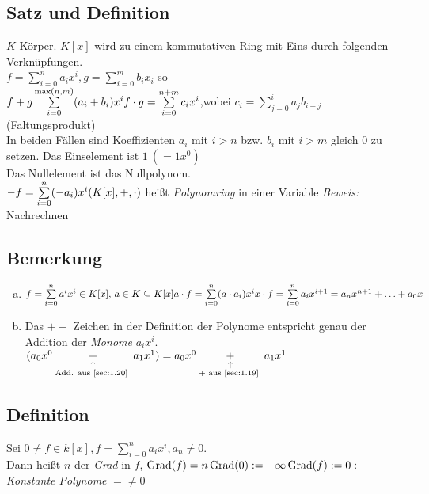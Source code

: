 \subsection{Satz und Definition}\label{sec:1.20}
$K$ Körper. $K[x]$ wird zu einem kommutativen Ring mit Eins durch folgenden Verknüpfungen.\\
$f = \sum\limits_{i=0}^{n} a_ix^i, g = \sum\limits_{i=0}^{m}b_ix_i$ so \\
$f + g \sum\limits_{i=0}^{\max(n,m)} (a_i+b_i)x^i\\
f \cdot g = \sum\limits_{i=0}^{n+m} c_ix^i$,wobei $c_i = \sum\limits_{j = 0}^{i} a_jb_{i-j}$ \hfill(Faltungsprodukt)\\
In beiden Fällen sind Koeffizienten $a_i$ mit $i > n$ bzw. $b_i$ mit $i > m$ gleich 0 zu setzen. Das Einselement ist $1\ (= 1 x^0)$\\ Das Nullelement ist das Nullpolynom.\\
$-f =\sum\limits_{i=0}^{n}(-a_i)x^i\\
(K[x],+,\cdot)$ hei\ss t \emph{Polynomring} in einer Variable
\emph{Beweis:} Nachrechnen
\subsection{Bemerkung}\label{sec:1.21}
\begin{enumerate}[a)]
\item $f = \sum\limits_{i=0}^{n} a^ix^i \in K[x],\, a \in K \subseteq K[x]\\
a \cdot f = \sum\limits_{i=0}^{n} (a \cdot a_i)x^i\\
x \cdot f = \sum\limits_{i=0}^{n}a_ix^{i+1} = a_nx^{n+1} + \ldots + a_0x$
\item Das $+-$ Zeichen in der Definition der Polynome entspricht genau der Addition der \emph{Monome} $a_ix^i$.\\
$(a_0 x^0 \underset{\substack{\uparrow\\\text{Add. aus \ref{sec:1.20} }}}{+} a_1x^1) = a_0x^0 \underset{\substack{\uparrow\\\text{+ aus \ref{sec:1.19} }}}{+} a_1x^1$
\end{enumerate}
\subsection{Definition}\label{sec:1.22}
Sei $0 \ne f \in k[x], f = \sum\limits_{i=0}^{n}a_ix^i, a_n \ne 0$.\\
Dann hei\ss t $n$ der \emph{Grad} in $f$, $\operatorname{Grad}(f) = n\\
\operatorname{Grad}(0): = -\infty\\
\operatorname{Grad}(f): = 0 :$\emph{Konstante Polynome} $=\ne 0$
